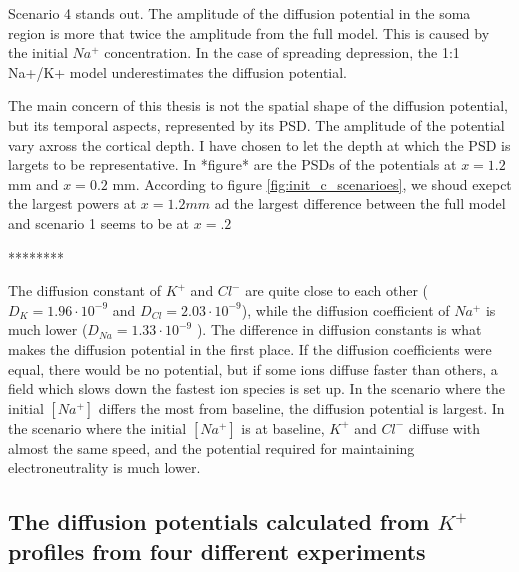 \documentclass{article}
\begin{document}
Scenario 4 stands out. The amplitude of the diffusion potential in the soma region is more that twice the amplitude from the full model. This is caused by the initial $Na^+$ concentration. In the case of spreading depression, the 1:1 Na+/K+ model underestimates the diffusion potential. 

The main concern of this thesis is not the spatial shape of the diffusion potential, but its temporal aspects, represented by its PSD. The amplitude of the potential vary axross the cortical depth. I have chosen to let the depth at which the PSD is largets to be representative. In *figure* are the PSDs of the potentials at $x=1.2$ mm and $x=0.2$ mm.   According to figure \ref{fig:init_c_scenarioes}, we shoud exepct the largest powers at $x=1.2 mm$ ad the largest difference between the full model and scenario 1 seems to be at $x=.2$


********


 The diffusion constant of $K^+$ and $Cl^-$ are quite close to each other ($D_K = 1.96\cdot 10^{-9}$ and $D_{Cl} = 2.03\cdot 10^{-9}$), while the diffusion coefficient of $Na^+$ is much lower ($D_{Na} = 1.33\cdot 10^{-9}$ ). The difference in diffusion constants is what makes the diffusion potential in the first place. If the diffusion coefficients were equal, there would be no potential, but if some ions diffuse faster than others, a field which slows down the fastest ion species is set up. In the scenario where the initial $[Na^+]$ differs the most from baseline, the diffusion potential is largest. In the scenario where the initial $[Na^+]$ is at baseline, $K^+$ and $Cl^-$ diffuse with almost the same speed, and the potential required for maintaining electroneutrality is much lower. 




\subsection{The diffusion potentials calculated from $K^+$ profiles from four different experiments}\label{diffusion potentials}
\end{document}
